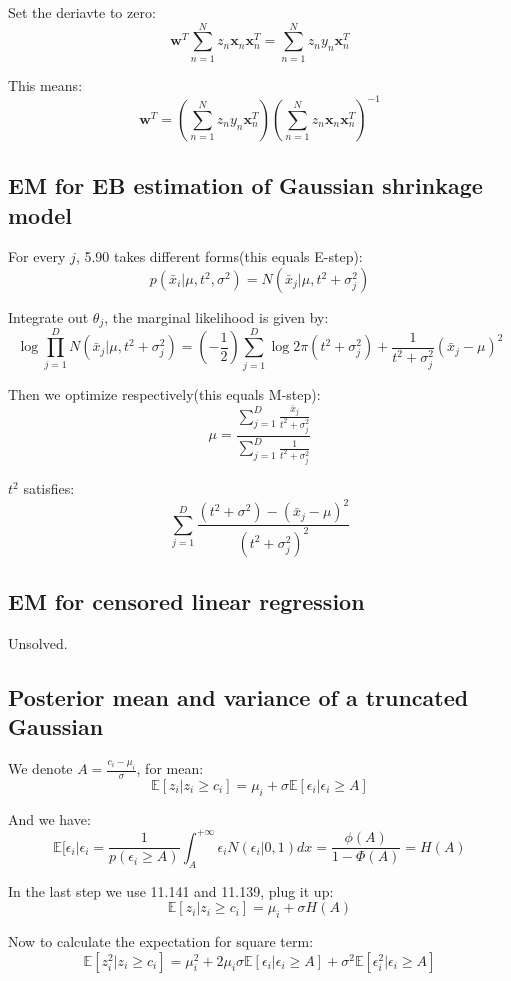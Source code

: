 \documentclass[UTF8]{ctexart}
\begin{document}
Set the deriavte to zero:
$$\textbf{w}^{T}\sum_{n=1}^{N}z_{n}\textbf{x}_{n}\textbf{x}_{n}^{T}=\sum_{n=1}^{N}z_{n}y_{n}\textbf{x}_{n}^{T}$$

This means:
$$\textbf{w}^{T}=(\sum_{n=1}^{N}z_{n}y_{n}\textbf{x}_{n}^{T})(\sum_{n=1}^{N}z_{n}\textbf{x}_{n}\textbf{x}_{n}^{T})^{-1}$$


\subsection{EM for EB estimation of Gaussian shrinkage model}
For every $j$, 5.90 takes different forms(this equals E-step):
$$p(\bar{x}_{i}|\mu,t^{2},\sigma^{2})=N(\bar{x}_{j}|\mu,t^{2}+\sigma^{2}_{j})$$

Integrate out $\theta_{j}$, the marginal likelihood is given by:
$$\log \prod_{j=1}^{D}N(\bar{x}_{j}|\mu,t^{2}+\sigma^{2}_{j}) = (-\frac{1}{2})\sum_{j=1}^{D}\log 2\pi(t^{2}+\sigma_{j}^{2})+\frac{1}{t^{2}+\sigma_{j}^{2}}(\bar{x}_{j}-\mu)^{2}$$

Then we optimize respectively(this equals M-step):
$$\mu=\frac{\sum_{j=1}^{D}\frac{\bar{x}_{j}}{t^{2}+\sigma_{j}^{2}}}{\sum_{j=1}^{D}\frac{1}{t^{2}+\sigma_{j}^{2}}}$$

$t^{2}$ satisfies:
$$\sum_{j=1}^{D}\frac{(t^{2}+\sigma^{2})-(\bar{x}_{j}-\mu)^{2}}{(t^{2}+\sigma_{j}^{2})^{2}}$$

\subsection{EM for censored linear regression}
Unsolved.

\subsection{Posterior mean and variance of a truncated Gaussian}
We denote $A=\frac{c_{i}-\mu_{i}}{\sigma}$, for mean:
$$\mathbb{E}[z_{i}|z_{i} \geq c_{i}]=\mu_{i}+\sigma \mathbb{E}[\epsilon_{i}|\epsilon_{i} \geq A]$$

And we have:
$$\mathbb{E}[\epsilon_{i}|\epsilon_{i}=\frac{1}{p(\epsilon_{i} \geq A)}\int_{A}^{+\infty}\epsilon_{i}N(\epsilon_{i}|0,1)dx=\frac{\phi(A)}{1-\Phi(A)}=H(A)$$

In the last step we use 11.141 and 11.139, plug it up:
$$\mathbb{E}[z_{i}|z_{i} \geq c_{i}]=\mu_{i}+\sigma H(A)$$

Now to calculate the expectation for square term:
$$\mathbb{E}[z_{i}^{2}|z_{i} \geq c_{i}]=\mu_{i}^{2} + 2\mu_{i}\sigma \mathbb{E}[\epsilon_{i}|\epsilon_{i} \geq A] + \sigma^{2}\mathbb{E}[\epsilon_{i}^{2}|\epsilon_{i} \geq A]$$
\end{document}
